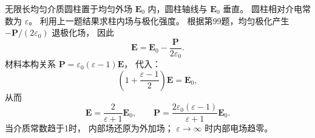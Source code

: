 无限长均匀介质圆柱置于均匀外场
$\bm E_0$ 内，圆柱轴线与 $\bm E_0$ 垂直。
圆柱相对介电常数为 $\varepsilon$。
利用上一题结果求柱内场与极化强度。
\exsolution
根据第99题，均匀极化产生
$-\bm P/(2\varepsilon_0)$ 退极化场，
因此
\[
\bm E=\bm E_0-\frac{\bm P}{2\varepsilon_0}.
\]
材料本构关系
$\bm P=\varepsilon_0(\varepsilon-1)\bm E$，
代入：
\[
\left(1+\frac{\varepsilon-1}{2}\right)\bm E
=\bm E_0,
\]
从而
\[
\boxed{\bm E=
\frac2{\varepsilon+1}\bm E_0},
\qquad
\boxed{\bm P=
\frac{2\varepsilon_0(\varepsilon-1)}
{\varepsilon+1}\bm E_0}.
\]
\excheck 当介质常数趋于1时，
内部场还原为外加场；
$\varepsilon\to\infty$ 时内部电场趋零。

